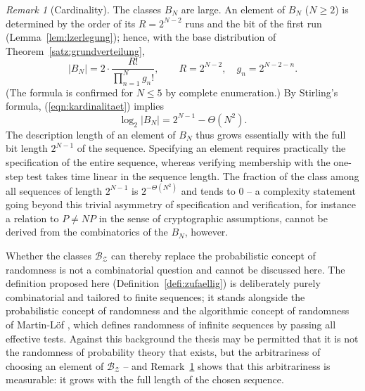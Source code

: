 \documentclass[11pt,a4paper]{scrartcl}
\theoremstyle{plain}
\theoremstyle{definition}
\theoremstyle{remark}
\newtheorem{bem}[satz]{Remark}
\begin{document}
\begin{bem}[Cardinality]\label{bem:kardinalitaet}
The classes $B_N$ are large. An element of $B_N$ ($N\geq 2$) is
determined by the order of its $R=2^{N-2}$ runs and the bit of the
first run (Lemma~\ref{lem:lzerlegung}); hence, with the base
distribution of Theorem~\ref{satz:grundverteilung},
\begin{equation}\label{eqn:kardinalitaet}
  \left|B_N\right|
  = 2\cdot\frac{R!}{\prod_{n=1}^{N} g_n!},
  \qquad R=2^{N-2},\quad g_n=2^{N-2-n}.
\end{equation}
(The formula is confirmed for $N\leq 5$ by complete enumeration.)
By Stirling's formula, (\ref{eqn:kardinalitaet}) implies
\begin{equation}\label{eqn:kardinalitaetasymptotik}
  \log_2\left|B_N\right| = 2^{N-1}-\Theta\!\left(N^2\right).
\end{equation}
The description length of an element of $B_N$ thus grows essentially
with the full bit length $2^{N-1}$ of the sequence. Specifying an
element requires practically the specification of the entire
sequence, whereas verifying membership with the one-step test takes
time linear in the sequence length. The fraction of the class among
all sequences of length $2^{N-1}$ is $2^{-\Theta(N^2)}$ and tends to
$0$ -- a complexity statement going beyond this trivial asymmetry of
specification and verification, for instance a relation to
$P\neq NP$ in the sense of cryptographic assumptions, cannot be
derived from the combinatorics of the $B_N$, however.
\end{bem}

\noindent Whether the classes $\mathcal{B_Z}$ can thereby replace
the probabilistic concept of randomness is not a
combinatorial question and cannot be discussed here. The definition proposed here
(Definition~\ref{defi:zufaellig}) is deliberately purely
combinatorial and tailored to finite sequences; it stands alongside
the probabilistic concept of randomness \cite{kolmogoroff1933} and
the algorithmic concept of randomness of Martin-Löf
\cite{martinloef1966}, which defines randomness of infinite sequences
by passing all effective tests. Against this background the thesis
may be permitted that it is not the randomness of probability theory
that exists, but the arbitrariness of choosing an element of
$\mathcal{B_Z}$ -- and Remark~\ref{bem:kardinalitaet} shows that this
arbitrariness is measurable: it grows with the full length of the
chosen sequence.

\end{document}
